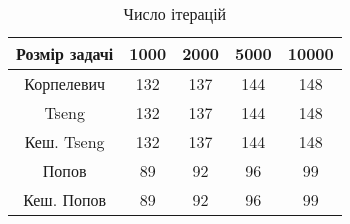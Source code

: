 \begin{table}[H]
	\centering
	\begin{tabular}{|c||c|c|c|c|}\hline
		Розмір задачі & 1000 & 2000 & 5000 & 10000 \\ \hline \hline
		Корпелевич & 132 & 137 & 144 & 148 \\ \hline
		Tseng & 132 & 137 & 144 & 148 \\ \hline
		Кеш. Tseng & 132 & 137 & 144 & 148 \\ \hline
		Попов & 89 & 92 & 96 & 99 \\ \hline
		Кеш. Попов & 89 & 92 & 96 & 99 \\ \hline
	\end{tabular}
	\caption{Число ітерацій}
\end{table}
